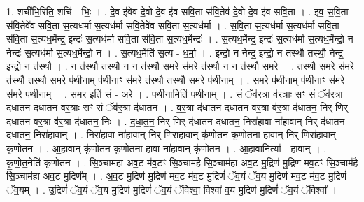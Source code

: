 \documentclass[17pt]{extarticle}
\begin{document}
1. शची॑भि॒रिति॒ शचि॑ - भिः॒ । . दे॒व इ॑वेव दे॒वो दे॒व इ॑व सवि॒ता स॑वि॒तेव॑ दे॒वो दे॒व इ॑व सवि॒ता । . इ॒व॒ स॒वि॒ता स॑वि॒तेवे॑व सवि॒ता स॒त्यध॑र्मा स॒त्यध॑र्मा सवि॒तेवे॑व सवि॒ता स॒त्यध॑र्मा । . स॒वि॒ता स॒त्यध॑र्मा स॒त्यध॑र्मा सवि॒ता स॑वि॒ता स॒त्यध॒र्मेन्द्र॒ इन्द्रः॑ स॒त्यध॑र्मा सवि॒ता स॑वि॒ता स॒त्यध॒र्मेन्द्रः॑ । . स॒त्यध॒र्मेन्द्र॒ इन्द्रः॑ स॒त्यध॑र्मा स॒त्यध॒र्मेन्द्रो॒ न नेन्द्रः॑ स॒त्यध॑र्मा स॒त्यध॒र्मेन्द्रो॒ न । . स॒त्यध॒र्मेति॑ स॒त्य - ध॒र्मा॒ । . इन्द्रो॒ न नेन्द्र॒ इन्द्रो॒ न त॑स्थौ तस्थौ॒ नेन्द्र॒ इन्द्रो॒ न त॑स्थौ । . न त॑स्थौ तस्थौ॒ न न त॑स्थौ सम॒रे स॑म॒रे त॑स्थौ॒ न न त॑स्थौ सम॒रे । . त॒स्थौ॒ स॒म॒रे स॑म॒रे त॑स्थौ तस्थौ सम॒रे प॑थी॒नाम् प॑थी॒नाꣳ स॑म॒रे त॑स्थौ तस्थौ सम॒रे प॑थी॒नाम् । . स॒म॒रे प॑थी॒नाम् प॑थी॒नाꣳ स॑म॒रे स॑म॒रे प॑थी॒नाम् । . स॒म॒र इति॑ सं - अ॒रे । . प॒थी॒नामिति॑ पथी॒नाम् । . सं ॅव॑र॒त्रा व॑र॒त्राः सꣳ सं ॅव॑र॒त्रा द॑धातन दधातन वर॒त्राः सꣳ सं ॅव॑र॒त्रा द॑धातन । . व॒र॒त्रा द॑धातन दधातन वर॒त्रा व॑र॒त्रा द॑धातन॒ निर् णिर् द॑धातन वर॒त्रा व॑र॒त्रा द॑धातन॒ निः । . द॒धा॒त॒न॒ निर् णिर् द॑धातन दधातन॒ निरा॑हा॒वा ना॑हा॒वान् निर् द॑धातन दधातन॒ निरा॑हा॒वान् । . निरा॑हा॒वा ना॑हा॒वान् निर् णिरा॑हा॒वान् कृ॑णोतन कृणोतना हा॒वान् निर् णिरा॑हा॒वान् कृ॑णोतन । . आ॒हा॒वान् कृ॑णोतन कृणोतना हा॒वा ना॑हा॒वान् कृ॑णोतन । . आ॒हा॒वानित्या᳚ - हा॒वान् । . कृ॒णो॒त॒नेति॑ कृणोतन । . सि॒ञ्चाम॑हा अव॒ट म॑व॒टꣳ सि॒ञ्चाम॑है सि॒ञ्चाम॑हा अव॒ट मु॒द्रिण॑ मु॒द्रिण॑ मव॒टꣳ सि॒ञ्चाम॑है सि॒ञ्चाम॑हा अव॒ट मु॒द्रिण᳚म् । . अ॒व॒ट मु॒द्रिण॑ मु॒द्रिण॑ मव॒ट म॑व॒ट मु॒द्रिणं॑ ॅव॒यं ॅव॒य मु॒द्रिण॑ मव॒ट म॑व॒ट मु॒द्रिणं॑ ॅव॒यम् । . उ॒द्रिणं॑ ॅव॒यं ॅव॒य मु॒द्रिण॑ मु॒द्रिणं॑ ॅव॒यं ॅविश्वा॒ विश्वा॑ व॒य मु॒द्रिण॑ मु॒द्रिणं॑ ॅव॒यं ॅविश्वा᳚ । \newline
\end{document}
